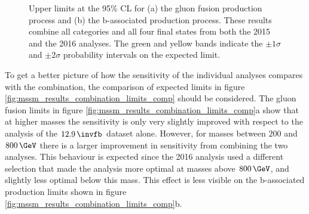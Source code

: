 \begin{figure}[h!]
\begin{center}
\end{center}
\caption[Upper limits at the 95\% CL for the gluon fusion and b-associated production
process, obtained by combining all channels and categories of the 2015 and the 2016 analyses.]{Upper limits at the 95\% \ac{CL} for (a) the gluon fusion production
process and (b) the b-associated production process. These results
combine all categories and all four final states from both the 2015
and the 2016 analyses. The green and yellow bands indicate
the $\pm 1\sigma$ and $\pm 2\sigma$ probability intervals on the expected limit.}
\label{fig:mssm_results_combination_limits}
\end{figure}

To get a better picture of how the sensitivity of the individual analyses compares
with the combination, the comparison 
of expected limits in figure \ref{fig:mssm_results_combination_limits_comp} should be considered. The
gluon fusion limits in figure \ref{fig:mssm_results_combination_limits_comp}a show that at
higher masses the sensitivity is only very slightly improved with respect to the 
analysis of the $12.9\,\invfb$ dataset alone. However, for masses between $200$ and $800\,\GeV$
there is a larger improvement in sensitivity from combining the two analyses.
This behaviour is expected since the 2016 analysis used a different
selection that made the analysis more optimal at masses above $800\,\GeV$,
and slightly less optimal below this mass. This
effect is less visible on the b-associated production limits shown in figure \ref{fig:mssm_results_combination_limits_comp}b.

